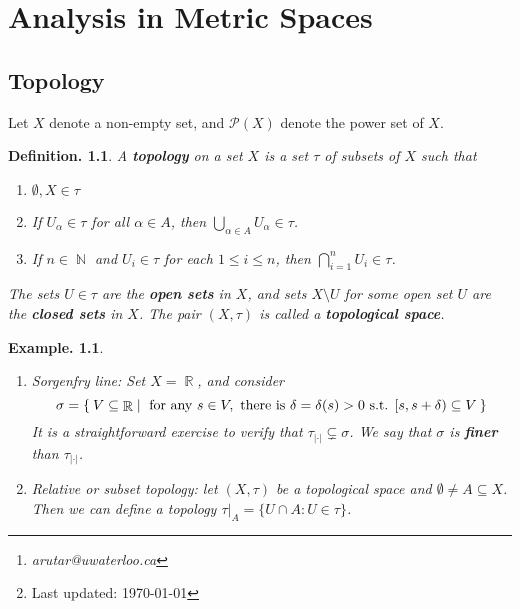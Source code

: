 \documentclass[11pt, a4paper]{memoir}
\title{\subject}
\author{Alex Rutar\thanks{\itshape arutar@uwaterloo.ca}\\ University of Waterloo}
\date{\semester\thanks{Last updated: \today}}
\DeclareMathOperator{\N}{{\mathbb{N}}}
\DeclareMathOperator{\R}{{\mathbb{R}}}
\newcommand{\abs}[1]{\ensuremath{\left\lvert#1\right\rvert}}
\theoremstyle{change}
\theoremstyle{plain}
\theoremstyle{nonumberplain}
\newtheorem{definition}{Definition.}
\newtheorem{example}{Example.}
\numberwithin{equation}{section}
\begin{document}
\hypersetup{pageanchor=false}
\maketitle
\newpage
\frontmatter
\hypersetup{pageanchor=true}
\tableofcontents*
\newpage
\mainmatter


\chapter{Analysis in Metric Spaces}
\section{Topology}
Let $X$ denote a non-empty set, and $\mathcal{P}(X)$ denote the power set of $X$.
\begin{definition}
    A \textbf{topology} on a set $X$ is a set $\tau$ of subsets of $X$ such that
    \begin{enumerate}[nl,r]
        \item $\emptyset,X\in\tau$
        \item If $U_\alpha\in\tau$ for all $\alpha\in A$, then $\bigcup_{\alpha\in A}U_\alpha\in\tau$.
        \item If $n\in\N$ and $U_i\in\tau$ for each $1\leq i\leq n$, then $\bigcap_{i=1}^n U_i\in\tau$.
    \end{enumerate}
    The sets $U\in\tau$ are the \textbf{open sets} in $X$, and sets $X\setminus U$ for some open set $U$ are the \textbf{closed sets} in $X$.
    The pair $(X,\tau)$ is called a \textbf{topological space}.
\end{definition}
\begin{example}
    \begin{enumerate}[nl,r]
        \item \textit{Sorgenfry line:}
            Set $X=\R$, and consider
            \begin{equation*}
                \sigma=\Set{V\subseteq\R | \text{ for any }s\in V,\text{ there is }\delta=\delta(s)>0\text{ s.t. }[s,s+\delta)\subseteq V}
            \end{equation*}
            It is a straightforward exercise to verify that $\tau_{\abs{\cdot}}\subsetneq\sigma$.
            We say that $\sigma$ is \textbf{finer} than $\tau_{\abs{\cdot}}$.
        \item \textit{Relative or subset topology}: let $(X,\tau)$ be a topological space and $\emptyset\neq A\subseteq X$.
            Then we can define a topology $\tau|_A=\{U\cap A:U\in\tau\}$.
    \end{enumerate}
\end{example}
\end{document}
